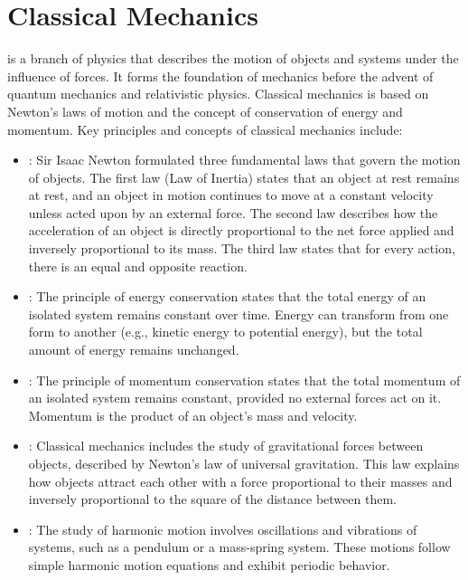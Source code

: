 \chapter{Classical Mechanics}
\thispagestyle{fancy}

 is a branch of physics that describes the motion of objects and systems under the influence of forces. It forms the foundation of mechanics before the advent of quantum mechanics and relativistic physics. Classical mechanics is based on Newton's laws of motion and the concept of conservation of energy and momentum. Key principles and concepts of classical mechanics include:

\begin{itemize}
	\item {}: Sir Isaac Newton formulated three fundamental laws that govern the motion of objects. The first law (Law of Inertia) states that an object at rest remains at rest, and an object in motion continues to move at a constant velocity unless acted upon by an external force. The second law describes how the acceleration of an object is directly proportional to the net force applied and inversely proportional to its mass. The third law states that for every action, there is an equal and opposite reaction.
	
	\item {}: The principle of energy conservation states that the total energy of an isolated system remains constant over time. Energy can transform from one form to another (e.g., kinetic energy to potential energy), but the total amount of energy remains unchanged.
	
	\item {}: The principle of momentum conservation states that the total momentum of an isolated system remains constant, provided no external forces act on it. Momentum is the product of an object's mass and velocity.
	
	\item {}: Classical mechanics includes the study of gravitational forces between objects, described by Newton's law of universal gravitation. This law explains how objects attract each other with a force proportional to their masses and inversely proportional to the square of the distance between them.
	
	\item {}: The study of harmonic motion involves oscillations and vibrations of systems, such as a pendulum or a mass-spring system. These motions follow simple harmonic motion equations and exhibit periodic behavior.
\end{itemize}

